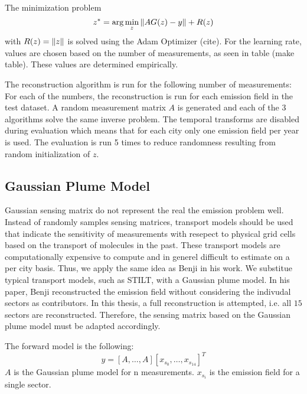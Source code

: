 The minimization problem
\begin{equation}
    z^* = \arg\min_{z}{\left\lVert A G(z) - y\right\rVert + R(z)}
\end{equation}
with $R(z) = \left\lVert z\right\rVert$ is solved using the Adam Optimizer (cite).
For the learning rate, values are chosen based on the number of measurements, as seen in table (make table).
These values are determined empirically.

The reconstruction algorithm is run for the following number of measurements:
For each of the numbers, the reconstruction is run for each emission field in the test dataset.
A random measurement matrix $A$ is generated and each of the $3$ algorithms solve the same inverse problem.
The temporal transforms are disabled during evaluation which means that for each city only one emission field per year is used.
The evaluation is run 5 times to reduce randomness resulting from random initialization of $z$.

\subsection{Gaussian Plume Model}
Gaussian sensing matrix do not represent the real the emission problem well.
Instead of randomly samples sensing matrices, transport models should be used that indicate the sensitivity of measurements with resepect to physical grid cells based on the transport of molecules in the past.
These transport models are computationally expensive to compute and in generel difficult to estimate on a per city basis.
Thus, we apply the same idea as Benji in his work.
We substitue typical transport models, such as STILT, with a Gaussian plume model.
In his paper, Benji reconstructed the emission field without considering the indivudal sectors as contributors.
In this thesis, a full reconstruction is attempted, i.e. all $15$ sectors are reconstructed.
Therefore, the sensing matrix based on the Gaussian plume model must be adapted accordingly.

The forward model is the following:
\begin{equation}
    y = [A, \dots, A] [x_{s_0}, \dots, x_{s_{14}}]^T
\end{equation}
$A$ is the Gaussian plume model for n measurements.
$x_{s_i}$ is the emission field for a single sector.


